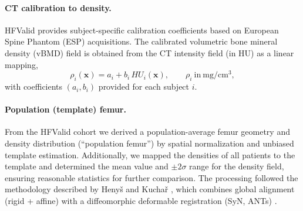 \paragraph{CT calibration to density.}
HFValid provides subject-specific calibration coefficients based on European Spine Phantom (ESP) acquisitions. The calibrated volumetric bone mineral density (vBMD) field is obtained from the CT intensity field (in HU) as a linear mapping,
\begin{equation}
\rho_i(\mathbf{x}) = a_i + b_i\, HU_i(\mathbf{x}),
\qquad \rho_i \ \text{in}\ \mathrm{mg/cm^3},
\label{eq:hfvalid_calibration}
\end{equation}
with coefficients $(a_i,b_i)$ provided for each subject $i$.

\paragraph{Population (template) femur.}
From the HFValid cohort we derived a population-average femur geometry and density distribution (``population femur'') by spatial normalization and unbiased template estimation. Additionally, we mapped the densities of all patients to the template and determined the mean value and $\pm 2\sigma$ range for the density field, ensuring reasonable statistics for further comparison. The processing followed the methodology described by Heny\v{s} and Kucha\v{r} \cite{Henys2025_BoneDatDatabase}, which combines global alignment (rigid + affine) with a diffeomorphic deformable registration (SyN, ANTs) \cite{Avants2008_SymmetricDiffeomorphicRegistration,Avants2011_ANTsSimilarityMetrics}.

